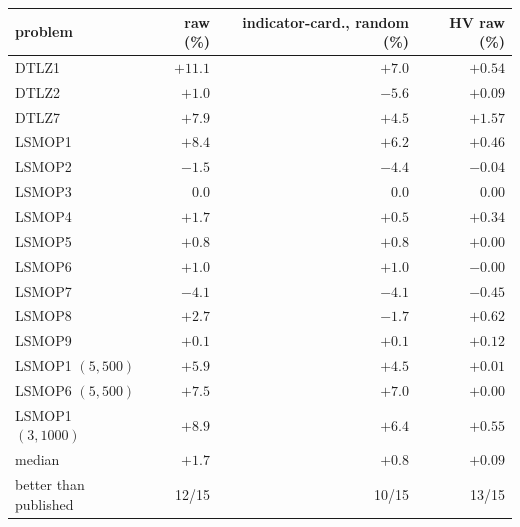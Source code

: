 \footnotesize
\setlength{\tabcolsep}{6pt}
\begin{tabular}{lrrr}
\toprule
problem & raw (\%) & indicator-card., random (\%) & HV raw (\%) \\
\midrule
DTLZ1 & $+11.1$ & $+7.0$  & $+0.54$ \\
DTLZ2 & $+1.0$ & $-5.6$  & $+0.09$ \\
DTLZ7 & $+7.9$ & $+4.5$  & $+1.57$ \\
LSMOP1 & $+8.4$ & $+6.2$  & $+0.46$ \\
LSMOP2 & $-1.5$ & $-4.4$  & $-0.04$ \\
LSMOP3 & $0.0$ & $0.0$  & $0.00$ \\
LSMOP4 & $+1.7$ & $+0.5$  & $+0.34$ \\
LSMOP5 & $+0.8$ & $+0.8$  & $+0.00$ \\
LSMOP6 & $+1.0$ & $+1.0$  & $-0.00$ \\
LSMOP7 & $-4.1$ & $-4.1$  & $-0.45$ \\
LSMOP8 & $+2.7$ & $-1.7$  & $+0.62$ \\
LSMOP9 & $+0.1$ & $+0.1$  & $+0.12$ \\
LSMOP1 $(5,500)$ & $+5.9$ & $+4.5$  & $+0.01$ \\
LSMOP6 $(5,500)$ & $+7.5$ & $+7.0$  & $+0.00$ \\
LSMOP1 $(3,1000)$ & $+8.9$ & $+6.4$  & $+0.55$ \\
\midrule
median & $+1.7$ & $+0.8$ & $+0.09$ \\
better than published & 12/15 & 10/15 & 13/15 \\
\bottomrule
\end{tabular}
